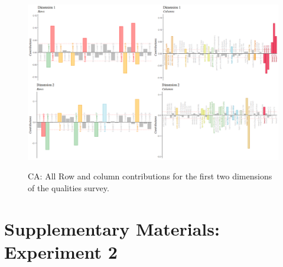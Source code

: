 \documentclass[
]{article}
\begin{document}
\begin{figure} 
  \centering  
  \caption{CA: All Row and column contributions for the first two dimensions of the qualities survey.}
    \includegraphics{./supmatsimgs/qconts.png}
  \label{fig:qconts}
\end{figure}

\hypertarget{supplementary-materials-experiment-2}{%
\section{Supplementary Materials: Experiment
2}\label{supplementary-materials-experiment-2}}
\end{document}
